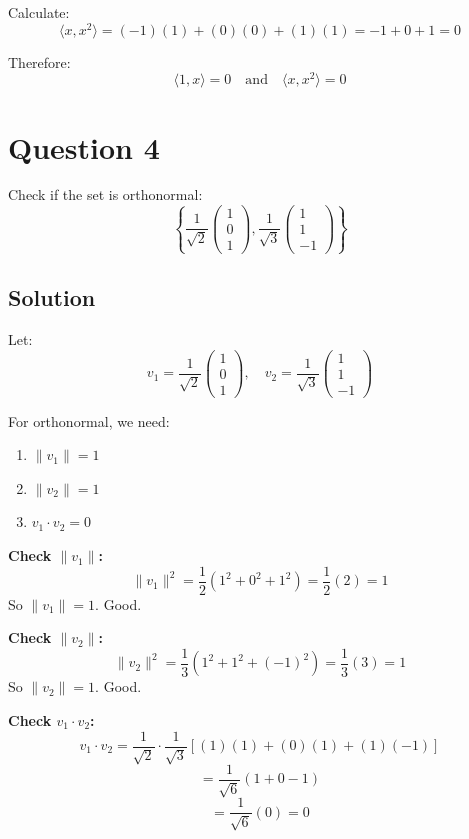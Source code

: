 \documentclass[12pt]{article}
\begin{document}
Calculate:
\[
\langle x, x^2 \rangle = (-1)(1) + (0)(0) + (1)(1) = -1 + 0 + 1 = 0
\]

Therefore:
\[
\langle 1, x \rangle = 0 \quad \text{and} \quad \langle x, x^2 \rangle = 0
\]

\section*{Question 4}
Check if the set is orthonormal:
\[
\left\{ \frac{1}{\sqrt{2}} \begin{pmatrix} 1 \\ 0 \\ 1 \end{pmatrix}, \frac{1}{\sqrt{3}} \begin{pmatrix} 1 \\ 1 \\ -1 \end{pmatrix} \right\}
\]

\subsection*{Solution}

Let:
\[
v_1 = \frac{1}{\sqrt{2}} \begin{pmatrix} 1 \\ 0 \\ 1 \end{pmatrix}, \quad v_2 = \frac{1}{\sqrt{3}} \begin{pmatrix} 1 \\ 1 \\ -1 \end{pmatrix}
\]

For orthonormal, we need:
\begin{enumerate}
\item $\|v_1\| = 1$
\item $\|v_2\| = 1$
\item $v_1 \cdot v_2 = 0$
\end{enumerate}

\textbf{Check $\|v_1\|$:}
\[
\|v_1\|^2 = \frac{1}{2}(1^2 + 0^2 + 1^2) = \frac{1}{2}(2) = 1
\]
So $\|v_1\| = 1$. Good.

\textbf{Check $\|v_2\|$:}
\[
\|v_2\|^2 = \frac{1}{3}(1^2 + 1^2 + (-1)^2) = \frac{1}{3}(3) = 1
\]
So $\|v_2\| = 1$. Good.

\textbf{Check $v_1 \cdot v_2$:}
\[
v_1 \cdot v_2 = \frac{1}{\sqrt{2}} \cdot \frac{1}{\sqrt{3}} \left[ (1)(1) + (0)(1) + (1)(-1) \right]
\]
\[
= \frac{1}{\sqrt{6}} (1 + 0 - 1)
\]
\[
= \frac{1}{\sqrt{6}} (0) = 0
\]
\end{document}
